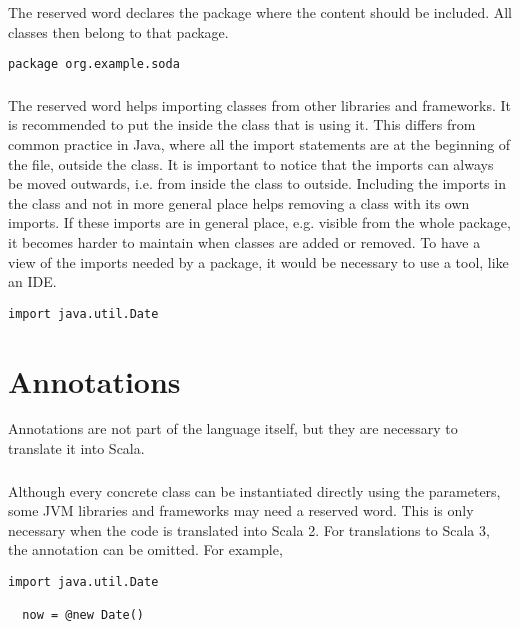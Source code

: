 The reserved word \spackage declares the package where the content should be included.
All classes then belong to that package.

\begin{lstlisting}[label={lst:examplePackage}]
  package org.example.soda
\end{lstlisting}

\subsubsection{\simport}

The reserved word \simport helps importing classes from other libraries and frameworks.
It is recommended to put the \simport inside the class that is using it.
This differs from common practice in Java, where all the import statements are at the beginning of the file, outside the class.
It is important to notice that the imports can always be moved outwards, i.e. from inside the class to outside.
Including the imports in the class and not in more general place helps removing a class with its own imports.
If these imports are in general place, e.g. visible from the whole package, it becomes harder to maintain when classes are added or removed.
To have a view of the imports needed by a package, it would be necessary to use a tool, like an IDE.


\begin{lstlisting}[label={lst:exampleImport}]
  import java.util.Date
\end{lstlisting}


\section{Annotations}

Annotations are not part of the language itself, but they are necessary to translate it into Scala.

\subsubsection{\snew}

Although every concrete class can be instantiated directly using the parameters, some JVM libraries and frameworks may need a \snew reserved word.
This is only necessary when the code is translated into Scala 2.
For translations to Scala 3, the \snew annotation can be omitted.
For example,

\begin{lstlisting}[label={lst:exampleImportDate}]
  import java.util.Date

  now = @new Date()
\end{lstlisting}

